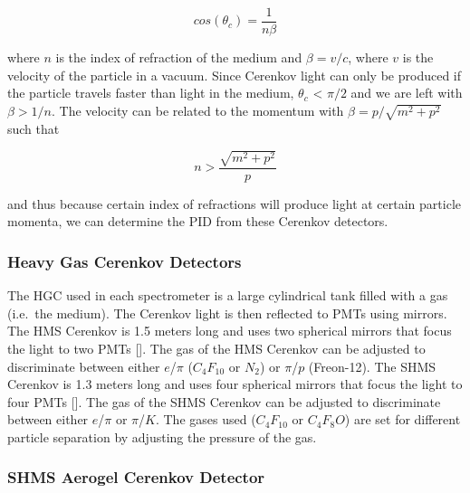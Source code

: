 \documentclass[
]{report}
\begin{document}
\begin{equation} 
  cos(\theta_c) = \frac{1}{n\beta}
  \label{eq:theta_cer} 
\end{equation}

where \(n\) is the index of refraction of the medium and \(\beta=v/c\),
where \(v\) is the velocity of the particle in a vacuum. Since Cerenkov
light can only be produced if the particle travels faster than light in
the medium, \(\theta_c\) \textless{} \(\pi/2\) and we are left with
\(\beta > 1/n\). The velocity can be related to the momentum with
\(\beta=p/\sqrt{m^2+p^2}\) such that

\begin{equation} 
  n >\frac{\sqrt{m^2+p^2}}{p}
  \label{eq:index_cer} 
\end{equation}

and thus because certain index of refractions will produce light at
certain particle momenta, we can determine the PID from these Cerenkov
detectors.

\hypertarget{heavy-gas-cerenkov-detectors}{%
\subsubsection{Heavy Gas Cerenkov
Detectors}\label{heavy-gas-cerenkov-detectors}}



The HGC used in each spectrometer is a large cylindrical tank filled
with a gas (i.e.~the medium). The Cerenkov light is then reflected to
PMTs using mirrors. The HMS Cerenkov is 1.5 meters long and uses two
spherical mirrors that focus the light to two PMTs
{[}\cite{c_cothran_threshold_1995}{]}. The gas of the HMS Cerenkov can
be adjusted to discriminate between either \(e\)/\(\pi\) (\(C_4F_{10}\)
or \(N_2\)) or \(\pi\)/\(p\) (Freon-12). The SHMS Cerenkov is 1.3 meters
long and uses four spherical mirrors that focus the light to four PMTs
{[}\cite{li_heavy_2012}{]}. The gas of the SHMS Cerenkov can be adjusted
to discriminate between either \(e\)/\(\pi\) or \(\pi\)/\(K\). The gases
used (\(C_4F_{10}\) or \(C_4F_8O\)) are set for different particle
separation by adjusting the pressure of the gas.

\hypertarget{shms-aerogel-cerenkov-detector}{%
\subsubsection{SHMS Aerogel Cerenkov
Detector}\label{shms-aerogel-cerenkov-detector}}
\end{document}
